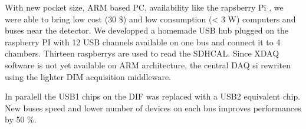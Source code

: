 \documentclass[english]{article}
\begin{document}
With new pocket size, ARM based PC, availability like the rapsberry Pi \cite{raspberry}, we were able to bring low cost (30 \$) and low consumption (< 3 W) computers and buses near the detector. We developped a homemade USB hub plugged on the raspberry PI with 12 USB channels available on one  bus and connect it to 4 chambers. Thirteen raspberrys are used to read the SDHCAL. Since XDAQ software is not yet available on ARM architecture, the central DAQ si rewriten using the lighter DIM \cite{DIM} acquisition middleware.

In paralell the USB1 chips on the DIF was replaced with a USB2 equivalent chip.  New buses speed and lower number of devices on each bus improves performances by 50 \%.
    
\end{document}
